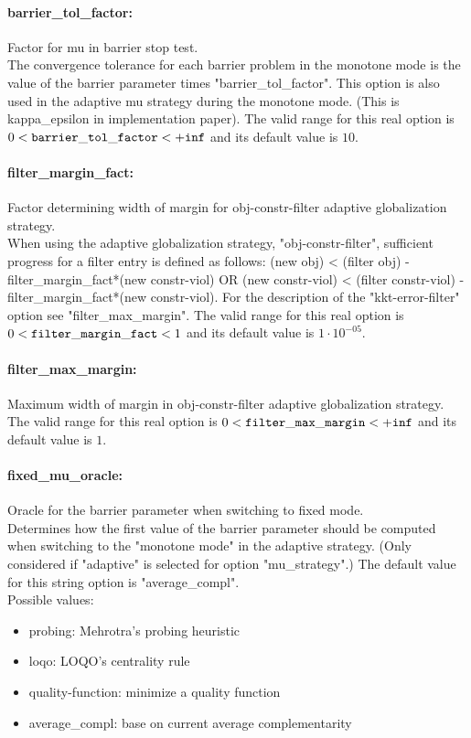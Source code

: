 \paragraph{barrier\_tol\_factor:}\label{sec:barrier_tol_factor} Factor for mu in barrier stop test. $\;$ \\
 The convergence tolerance for each barrier
problem in the monotone mode is the value of the
barrier parameter times "barrier\_tol\_factor".
This option is also used in the adaptive mu
strategy during the monotone mode. (This is
kappa\_epsilon in implementation paper). The valid range for this real option is 
$0 <  {\tt barrier\_tol\_factor } <  {\tt +inf}$
and its default value is $10$.


\paragraph{filter\_margin\_fact:}\label{sec:filter_margin_fact} Factor determining width of margin for obj-constr-filter adaptive globalization strategy. $\;$ \\
 When using the adaptive globalization strategy,
"obj-constr-filter", sufficient progress for a
filter entry is defined as follows: (new obj) <
(filter obj) - filter\_margin\_fact*(new
constr-viol) OR (new constr-viol) < (filter
constr-viol) - filter\_margin\_fact*(new
constr-viol).  For the description of the
"kkt-error-filter" option see
"filter\_max\_margin". The valid range for this real option is 
$0 <  {\tt filter\_margin\_fact } <  1$
and its default value is $1 \cdot 10^{-05}$.


\paragraph{filter\_max\_margin:}\label{sec:filter_max_margin} Maximum width of margin in obj-constr-filter adaptive globalization strategy. $\;$ \\
 The valid range for this real option is 
$0 <  {\tt filter\_max\_margin } <  {\tt +inf}$
and its default value is $1$.


\paragraph{fixed\_mu\_oracle:}\label{sec:fixed_mu_oracle} Oracle for the barrier parameter when switching to fixed mode. $\;$ \\
 Determines how the first value of the barrier
parameter should be computed when switching to
the "monotone mode" in the adaptive strategy.
(Only considered if "adaptive" is selected for
option "mu\_strategy".)
The default value for this string option is "average\_compl".
\\ 
Possible values:
\begin{itemize}
   \item probing: Mehrotra's probing heuristic
   \item loqo: LOQO's centrality rule
   \item quality-function: minimize a quality function
   \item average\_compl: base on current average complementarity
\end{itemize}

